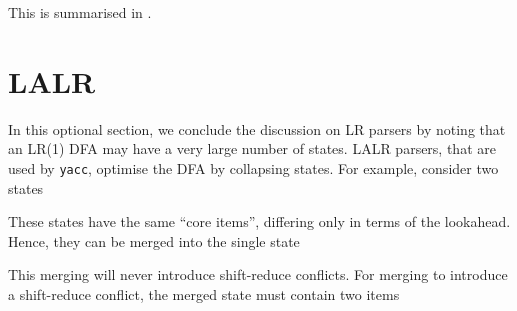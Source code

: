 This is summarised in .

\section{LALR\optional}
In this optional section, we conclude the discussion on LR parsers by noting that an LR(1) DFA may have a very large number of states. LALR parsers, that are used by \texttt{yacc}, optimise the DFA by collapsing states. For example, consider two states

\begin{center}
\end{center}

These states have the same ``core items'', differing only in terms of the lookahead. Hence, they can be merged into the single state

\begin{center}
\end{center}

This merging will never introduce shift-reduce conflicts. For merging to introduce a shift-reduce conflict, the merged state must contain two items

